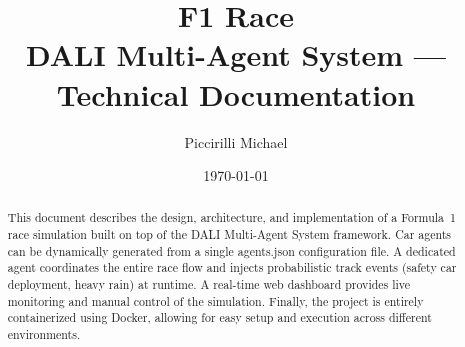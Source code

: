 ﻿\documentclass[12pt, a4paper]{article}
\title{%
  \vspace{-1.5cm}
  {\Large F1 Race}\\[0.4em]
  {\large DALI Multi-Agent System --- Technical Documentation}
}
\author{Piccirilli Michael}
\date{\today}
\begin{document}
\maketitle

\tableofcontents
\newpage

\begin{abstract}
This document describes the design, architecture, and implementation of a Formula~1 race simulation built on top of the DALI Multi-Agent System framework. Car agents can be dynamically generated from a single agents.json configuration file. A dedicated agent coordinates the entire race flow and injects probabilistic track events (safety car deployment, heavy rain) at runtime. A real-time web dashboard provides live monitoring and manual control of the simulation. Finally, the project is entirely containerized using Docker, allowing for easy setup and execution across different environments.
\end{abstract}

\bigskip













\end{document}

